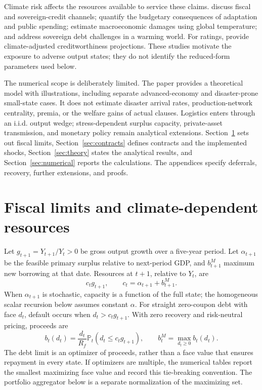 \documentclass[11pt]{article}
\newcommand{\Prob}{\mathbb P}
\begin{document}
Climate risk affects the resources available to service these claims. \textcite{Agarwala2021} discuss fiscal and sovereign-credit channels; \textcite{Barrage2020} quantify the budgetary consequences of adaptation and public spending; \textcite{BilalKanzig2026} estimate macroeconomic damages using global temperature; and \textcite{SeghiniDeesDeGaye2026} address sovereign debt challenges in a warming world. For ratings, \textcite{Klusak2023} provide climate-adjusted creditworthiness projections. These studies motivate the exposure to adverse output states; they do not identify the reduced-form parameters used below.

The numerical scope is deliberately limited. The paper provides a theoretical model with illustrations, including separate advanced-economy and disaster-prone small-state cases. It does not estimate disaster arrival rates, production-network centrality, premia, or the welfare gains of actual clauses. Logistics enters through an i.i.d. output wedge; stress-dependent surplus capacity, private-asset transmission, and monetary policy remain analytical extensions. Section~\ref{sec:baseline} sets out fiscal limits, Section~\ref{sec:contracts} defines contracts and the implemented shocks, Section~\ref{sec:theory} states the analytical results, and Section~\ref{sec:numerical} reports the calculations. The appendices specify deferrals, recovery, further extensions, and proofs.



\section{Fiscal limits and climate-dependent resources}\label{sec:baseline}
Let $g_{t+1}=Y_{t+1}/Y_t>0$ be gross output growth over a five-year period. Let $\alpha_{t+1}$ be the feasible primary surplus relative to next-period GDP, and $b^M_{t+1}$ maximum new borrowing at that date. Resources at $t+1$, relative to $Y_t$, are
\begin{equation}\label{eq:capacity}
 c_tg_{t+1},\qquad c_t=\alpha_{t+1}+b^M_{t+1}.
\end{equation}
When $\alpha_{t+1}$ is stochastic, capacity is a function of the full state; the homogeneous scalar recursion below assumes constant $\alpha$. For straight zero-coupon debt with face $d_t$, default occurs when $d_t>c_tg_{t+1}$. With zero recovery and risk-neutral pricing, proceeds are
\begin{equation}\label{eq:straight}
 b_t(d_t)=\frac{d_t}{R_f}\Prob_t(d_t\le c_tg_{t+1}),\qquad b_t^M=\max_{d_t\ge0}b_t(d_t).
\end{equation}
The debt limit is an optimizer of proceeds, rather than a face value that ensures repayment in every state. If optimizers are multiple, the numerical tables report the smallest maximizing face value and record this tie-breaking convention. The portfolio aggregator below is a separate normalization of the maximizing set.
\end{document}
